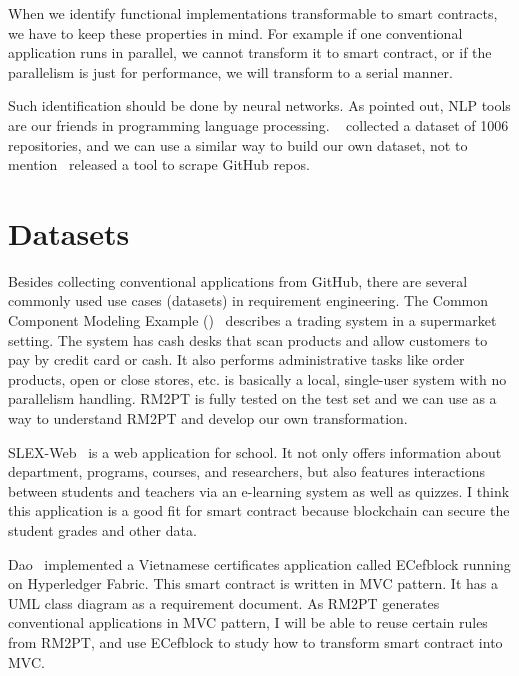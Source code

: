 When we identify functional implementations transformable to smart contracts, we have to keep these properties in mind. For example if one conventional application runs in parallel, we cannot transform it to smart contract, or if the parallelism is just for performance, we will transform to a serial manner.

Such identification should be done by neural networks. As  pointed out, NLP tools are our friends in programming language processing.
~\cite{jiang2017} collected a dataset of \num{1006} repositories,
and we can use a similar way to build our own dataset, not to mention~\cite{alexandru2017replicating} released a tool to scrape GitHub repos.




\section{Datasets}
Besides collecting conventional applications from GitHub,
there are several commonly used use cases (datasets) in requirement engineering.
The Common Component Modeling Example (\cocome)~\cite{herold2008cocome} describes a trading system in a supermarket setting.
The system has cash desks that scan products and allow customers to pay by credit card or cash. It also performs administrative tasks like order products, open or close stores, etc.
{\cocome} is basically a local, single-user system with no parallelism handling.
RM2PT is fully tested on the {\cocome} test set and we can use {\cocome} as a way to understand RM2PT and develop our own transformation.

SLEX-Web~\cite{jantan2012extension} is a web application for school. It not only offers information about department, programs, courses, and researchers, but also features interactions between students and teachers via an e-learning system as well as quizzes.
I think this application is a good fit for smart contract because blockchain can secure the student grades and other data.


Dao~\cite{dao2019challenges} implemented a Vietnamese certificates application called ECefblock running on Hyperledger Fabric. This smart contract is written in MVC pattern. It has a UML class diagram as a requirement document. As RM2PT generates conventional applications in MVC pattern, I will be able to reuse certain rules from RM2PT, and use ECefblock to study how to transform smart contract into MVC.



